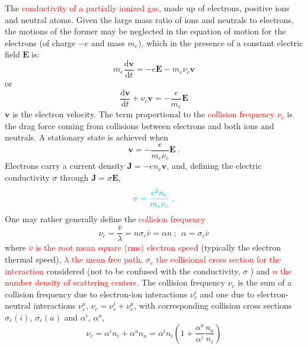 \documentclass[12pt,a4paper]{article}
\renewcommand{\vec}[1]{\boldsymbol{#1}}
\newcommand{\dif}{\mathrm{d}}
\begin{document}
\cite{2015bps..book.....C} The \textcolor{red}{conductivity of a partially ionized gas}, made up of electrons, positive ions and neutral atoms. Given the large mass ratio of ions and neutrals to electrons, the motions of the former may be neglected in the equation of motion for the electrons (of charge $-e$ and mass $m_e$), which in the presence of a constant electric field $\vec{E}$ is:
\begin{equation*}
m_e \frac{\dif \vec{v}}{\dif t} = -e\vec{E} -m_e \nu_c \vec{v}
\end{equation*}
or
\begin{equation*}
\frac{\dif \vec{v}}{\dif t} + \nu_c \vec{v} = -\frac{e}{m_e}\vec{E} 
\end{equation*}
$\vec{v}$ is the electron velocity. The term proportional to the \textcolor{red}{collision frequency $\nu_c$} is the drag force coming from collisions between electrons and both ions and neutrals. A stationary state is achieved when
\begin{equation*}
\vec{v} = -\frac{e}{m_e \nu_c} \vec{E} ~.
\end{equation*}
Electrons carry a current density $\vec{J} = -en_e \vec{v}$, and, defining the electric conductivity $\sigma$ through $\vec{J} =\sigma \vec{E}$,
\begin{equation}
\color{cyan} \sigma = \frac{e^2 n_e}{m_e \nu_c} ~,
\end{equation}
One may rather generally define the \textcolor{red}{collision frequency}
\begin{equation*}
\nu_c = \frac{\bar{v}}{\lambda} = n \sigma_c \bar{v} = \alpha n ~; ~~ \alpha = \sigma_c \bar{v}
\end{equation*}
where \textcolor{red}{$\bar{v}$ is the root mean square (rms) electron speed} (typically the electron thermal speed), \textcolor{red}{$\lambda$ the mean free path}, \textcolor{red}{$\sigma_c$ the collisional cross section for the interaction} considered (not to be confused with the conductivity, $\sigma$ ) and \textcolor{red}{$n$ the number density of scattering centers}. The collision frequency $\nu_c$ is the sum of a collision frequency due to electron-ion interactions $\nu_c^i$ and one due to electron-neutral interactions $\nu_c^a$, $\nu_c = \nu_c^i + \nu_c^a$, with corresponding collision cross sections $\sigma_c(i)$, $\sigma_c(a)$ and $\alpha^i$, $\alpha^a$,
\begin{equation*}
\nu_c = \alpha^i n_i +\alpha^a n_a = \alpha^i n_i \left(1 +\frac{\alpha^a}{\alpha^i}\frac{n_a}{n_i} \right)
\end{equation*}
\end{document}
